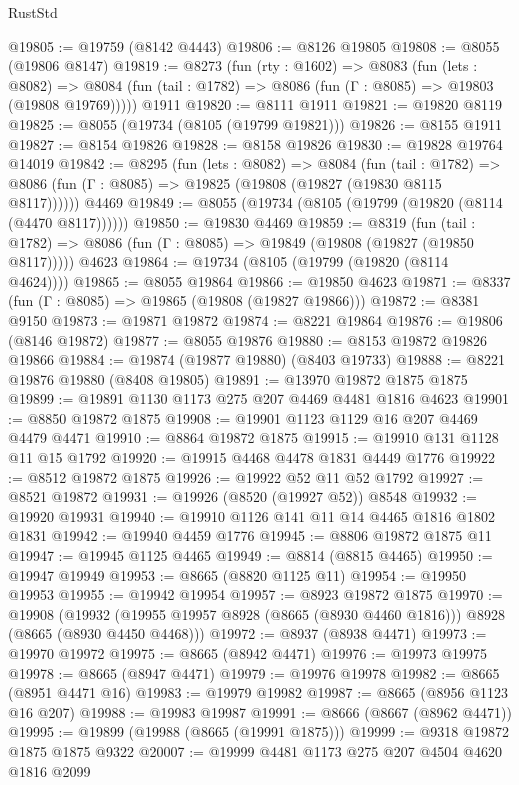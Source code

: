 \begin{lexlean}{RustStd}
\begin{coremodule}
@19805 := @19759 (@8142 @4443)
@19806 := @8126 @19805
@19808 := @8055 (@19806 @8147)
@19819 := @8273
    (fun (rty : @1602) =>
    @8083
      (fun (lets : @8082) =>
      @8084 (fun (tail : @1782) => @8086 (fun (Γ : @8085) => @19803 (@19808 @19769)))))
    @1911
@19820 := @8111 @1911
@19821 := @19820 @8119
@19825 := @8055 (@19734 (@8105 (@19799 @19821)))
@19826 := @8155 @1911
@19827 := @8154 @19826
@19828 := @8158 @19826
@19830 := @19828 @19764 @14019
@19842 := @8295
    (fun (lets : @8082) =>
    @8084
      (fun (tail : @1782) =>
      @8086 (fun (Γ : @8085) => @19825 (@19808 (@19827 (@19830 @8115 @8117))))))
    @4469
@19849 := @8055 (@19734 (@8105 (@19799 (@19820 (@8114 (@4470 @8117))))))
@19850 := @19830 @4469
@19859 := @8319
    (fun (tail : @1782) => @8086 (fun (Γ : @8085) => @19849 (@19808 (@19827 (@19850 @8117)))))
    @4623
@19864 := @19734 (@8105 (@19799 (@19820 (@8114 @4624))))
@19865 := @8055 @19864
@19866 := @19850 @4623
@19871 := @8337 (fun (Γ : @8085) => @19865 (@19808 (@19827 @19866)))
@19872 := @8381 @9150
@19873 := @19871 @19872
@19874 := @8221 @19864
@19876 := @19806 (@8146 @19872)
@19877 := @8055 @19876
@19880 := @8153 @19872 @19826 @19866
@19884 := @19874 (@19877 @19880) (@8403 @19733)
@19888 := @8221 @19876 @19880 (@8408 @19805)
@19891 := @13970 @19872 @1875 @1875
@19899 := @19891 @1130 @1173 @275 @207 @4469 @4481 @1816 @4623
@19901 := @8850 @19872 @1875
@19908 := @19901 @1123 @1129 @16 @207 @4469 @4479 @4471
@19910 := @8864 @19872 @1875
@19915 := @19910 @131 @1128 @11 @15 @1792
@19920 := @19915 @4468 @4478 @1831 @4449 @1776
@19922 := @8512 @19872 @1875
@19926 := @19922 @52 @11 @52 @1792
@19927 := @8521 @19872
@19931 := @19926 (@8520 (@19927 @52)) @8548
@19932 := @19920 @19931
@19940 := @19910 @1126 @141 @11 @14 @4465 @1816 @1802 @1831
@19942 := @19940 @4459 @1776
@19945 := @8806 @19872 @1875 @11
@19947 := @19945 @1125 @4465
@19949 := @8814 (@8815 @4465)
@19950 := @19947 @19949
@19953 := @8665 (@8820 @1125 @11)
@19954 := @19950 @19953
@19955 := @19942 @19954
@19957 := @8923 @19872 @1875
@19970 := @19908
    (@19932 (@19955 @19957 @8928 (@8665 (@8930 @4460 @1816))) @8928 (@8665 (@8930 @4450 @4468)))
@19972 := @8937 (@8938 @4471)
@19973 := @19970 @19972
@19975 := @8665 (@8942 @4471)
@19976 := @19973 @19975
@19978 := @8665 (@8947 @4471)
@19979 := @19976 @19978
@19982 := @8665 (@8951 @4471 @16)
@19983 := @19979 @19982
@19987 := @8665 (@8956 @1123 @16 @207)
@19988 := @19983 @19987
@19991 := @8666 (@8667 (@8962 @4471))
@19995 := @19899 (@19988 (@8665 (@19991 @1875)))
@19999 := @9318 @19872 @1875 @1875 @9322
@20007 := @19999 @4481 @1173 @275 @207 @4504 @4620 @1816 @2099

\end{coremodule}
\end{lexlean}
